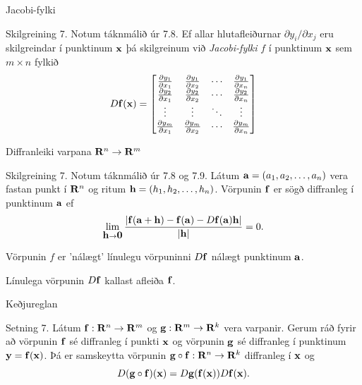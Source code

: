 \begin{frame}{Jacobi-fylki} 
 \begin {block}{Skilgreining 7.}
 Notum táknmálið úr 7.8.
Ef allar hlutafleiðurnar $\partial
y_i/\partial x_j$ eru skilgreindar í punktinum $\mbox{${\bf x}$}$ þá skilgreinum
við {\em Jacobi-fylki} $f$ í punktinum $\mbox{${\bf x}$}$ sem $m\times n$ fylkið
$$D\mbox{${\bf f}$}(\mbox{${\bf x}$})=\begin{bmatrix}
\frac{\partial y_1}{\partial x_1}&\frac{\partial y_1}{\partial x_2}&
\cdots&\frac{\partial y_1}{\partial x_n}\\
\frac{\partial y_2}{\partial x_1}&\frac{\partial y_2}{\partial x_2}&
\cdots&\frac{\partial y_2}{\partial x_n}\\
\vdots&\vdots&\ddots&\vdots\\
\frac{\partial y_m}{\partial x_1}&\frac{\partial y_m}{\partial x_2}&
\cdots&\frac{\partial y_m}{\partial x_n}
\end{bmatrix}$$
\end{block}
\end{frame}

\begin{frame}{Diffranleiki varpana $\mbox{${\bf R}^n$}\rightarrow\mbox{${\bf R}^m$}$} 
 \begin {block}{Skilgreining 7.}
 Notum táknmálið úr 7.8 og 7.9. Látum $\mbox{${\bf a}$}=(a_1, a_2, \ldots, a_n)$ vera fastan punkt í $\mbox{${\bf R}^n$}$ og ritum 
$\mbox{${\bf h}$}=(h_1,h_2,\ldots,h_n)$.  Vörpunin $\mbox{${\bf f}$}$ er
sögð diffranleg í punktinum $\mbox{${\bf a}$}$ ef
$$\lim_{\mbox{${\bf h}$}\rightarrow
  \mbox{${\bf 0}$}}\frac{|\mbox{${\bf f}$}(\mbox{${\bf a}$}+\mbox{${\bf h}$})-\mbox{${\bf f}$}(\mbox{${\bf a}$})-D\mbox{${\bf f}$}(\mbox{${\bf a}$})\mbox{${\bf h}$}|}{|\mbox{${\bf h}$}|}=0.$$ 
\end{block}
\bigskip
Vörpunin $f$ er 'nálægt' línulegu vörpuninni $D\mbox{${\bf f}$}$ nálægt punktinum $\mbox{${\bf a}$}$.

\bigskip
Línulega vörpunin $D\mbox{${\bf f}$}$ kallast afleiða $\mbox{${\bf f}$}$.

\end{frame}

\begin{frame}{Keðjureglan} 
 \begin {block}{Setning 7.}
Látum $\mbox{${\bf f}$}:\mbox{${\bf R}^n$}\rightarrow \mbox{${\bf R}^m$}$ og 
$\mbox{${\bf g}$}:\mbox{${\bf R}^m$}\rightarrow \mbox{${\bf R}^k$}$ vera varpanir.  Gerum ráð fyrir að vörpunin
$\mbox{${\bf f}$}$ sé diffranleg í punkti $\mbox{${\bf x}$}$ og vörpunin $\mbox{${\bf g}$}$ sé diffranleg í
punktinum $\mbox{${\bf y}$}=\mbox{${\bf f}$}(\mbox{${\bf x}$})$.  Þá er samskeytta vörpunin
$\mbox{${\bf g}$}\circ\mbox{${\bf f}$}:\mbox{${\bf R}^n$}\rightarrow\mbox{${\bf R}^k$}$ diffranleg í $\mbox{${\bf x}$}$ og 
$$D(\mbox{${\bf g}$}\circ\mbox{${\bf f}$})(\mbox{${\bf x}$})=D\mbox{${\bf g}$}(\mbox{${\bf f}$}(\mbox{${\bf x}$}))D\mbox{${\bf f}$}(\mbox{${\bf x}$}).$$

\end{block}

\end{frame}



